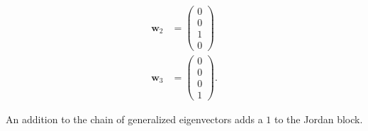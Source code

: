 \documentclass[10pt]{mypackage}
\begin{document}
\begin{solution}
\begin{enumerate}[(i)]
\begin{align*}
        \mathbf{w}_2 &= \begin{pmatrix}0\\0\\1\\0\end{pmatrix}\\
        \mathbf{w}_3 &= \begin{pmatrix}0\\0\\0\\1\end{pmatrix}.
      \end{align*}
  \end{enumerate}
  An addition to the chain of generalized eigenvectors adds a $1$ to the Jordan block.
\end{solution}
\end{document}
